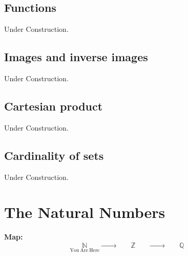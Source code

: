 \documentclass[a4paper,oneside]{book}
\begin{document}
		\section{Functions}
			Under Construction.
		\section{Images and inverse images}
			Under Construction.
		\section{Cartesian product}
			Under Construction.
		\section{Cardinality of sets}
			Under Construction.
	\chapter{The Natural Numbers}
		\textbf{Map:}
		\begin{equation*}
			\underset{\mathrm{You~Are~Here}}{\mathbb{N}} \xrightarrow{\quad \quad\quad}\underset{\mathrm{\phantom{\mathrm{You~Are~Here}}}}{\mathbb{Z}}\xrightarrow{\quad\quad\quad}\underset{\mathrm{\phantom{\mathrm{You~Are~Here}}}}{\mathbb{Q}}
		\end{equation*}
\end{document}
